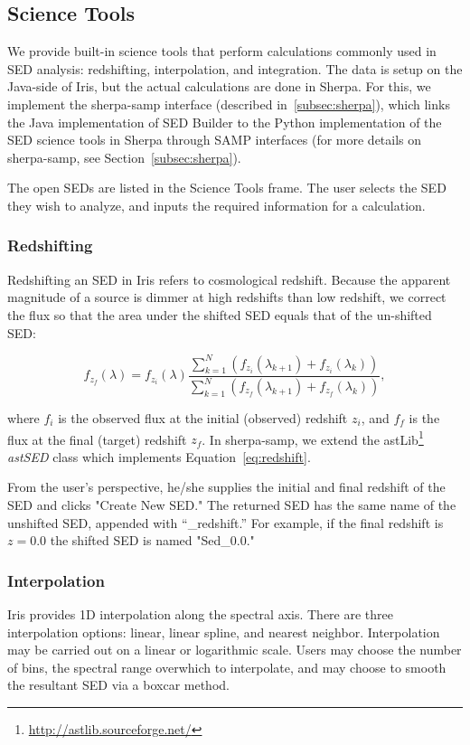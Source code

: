 \documentclass[5p]{elsarticle}
\begin{document}
\subsection{Science Tools}
We provide built-in science tools that perform calculations commonly used in SED analysis: redshifting, interpolation, and integration. The data is setup on the Java-side of Iris, but the actual calculations are done in Sherpa. For this, we implement the sherpa-samp interface (described in~\ref{subsec:sherpa}), which links the Java implementation of SED Builder to the Python implementation of the SED science tools in Sherpa through SAMP interfaces (for more details on sherpa-samp, see Section~\ref{subsec:sherpa}).

The open SEDs are listed in the Science Tools frame. The user selects the SED they wish to analyze, and inputs the required information for a calculation.

\subsubsection{Redshifting}
Redshifting an SED in Iris refers to cosmological redshift. Because the apparent magnitude of a source is dimmer at high redshifts than low redshift, we correct the flux so that the area under the shifted SED equals that of the un-shifted SED:

\begin{equation} \label{eq:redshift}
f_{z_{f}}(\lambda) = f_{z_{i}}(\lambda) \frac{\sum_{k=1}^N (f_{z_{i}}(\lambda_{k+1})+f_{z_{i}}(\lambda_{k}))}{\sum_{k=1}^N (f_{z_{f}}(\lambda_{k+1})+f_{z_{f}}(\lambda_{k}))},
\end{equation}

where $f_i$ is the observed flux at the initial (observed) redshift $z_i$, and $f_f$ is the flux at the final (target) redshift $z_f$. In sherpa-samp, we extend the astLib\footnote{\url{http://astlib.sourceforge.net/}} \textit{astSED} class which implements Equation~\ref{eq:redshift}.

From the user's perspective, he/she supplies the initial and final redshift of the SED and clicks "Create New SED." The returned SED has the same name of the unshifted SED, appended with ``\_redshift.'' For example, if the final redshift is \(z=0.0\) the shifted SED is named "Sed\_0.0."

\subsubsection{Interpolation}
Iris provides 1D interpolation along the spectral axis. There are three interpolation options: linear, linear spline, and nearest neighbor. Interpolation may be carried out on a linear or logarithmic scale. Users may choose the number of bins, the spectral range overwhich to interpolate, and may choose to smooth the resultant SED via a boxcar method.
\end{document}
